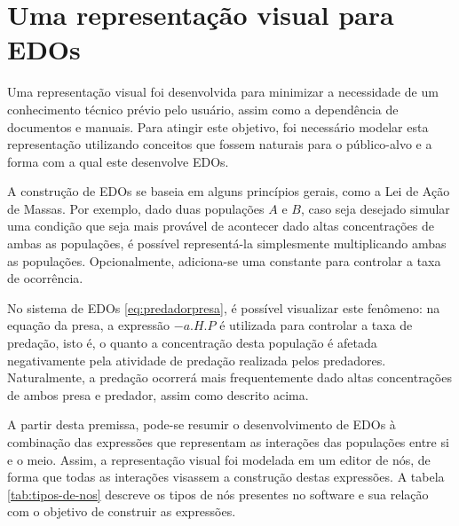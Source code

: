 \documentclass[
	12pt,				%
	openright,			%
	oneside,			%
	a4paper,			%
	main=brazil,
	english,			%
	]{ufsj-abntex2}
\begin{document}
\section{Uma representação visual para EDOs}
\label{sec:representacao-visual-edo}

Uma representação visual foi desenvolvida para minimizar a necessidade de um conhecimento técnico prévio pelo usuário, assim como a dependência de documentos e manuais. Para atingir este objetivo, foi necessário modelar esta representação utilizando conceitos que fossem naturais para o público-alvo e a forma com a qual este desenvolve EDOs.

A construção de EDOs se baseia em alguns princípios gerais, como a Lei de Ação de Massas. Por exemplo, dado duas populações $A$ e $B$, caso seja desejado simular uma condição que seja mais provável de acontecer dado altas concentrações de ambas as populações, é possível representá-la simplesmente multiplicando ambas as populações. Opcionalmente, adiciona-se uma constante para controlar a taxa de ocorrência.

No sistema de EDOs \ref{eq:predadorpresa}, é possível visualizar este fenômeno: na equação da presa, a expressão \(-a.H.P\) é utilizada para controlar a taxa de predação, isto é, o quanto a concentração desta população é afetada negativamente pela atividade de predação realizada pelos predadores. Naturalmente, a predação ocorrerá mais frequentemente dado altas concentrações de ambos presa e predador, assim como descrito acima.

A partir desta premissa, pode-se resumir o desenvolvimento de EDOs à combinação das expressões que representam as interações das populações entre si e o meio. Assim, a representação visual foi modelada em um editor de nós, de forma que todas as interações visassem a construção destas expressões. A tabela \ref{tab:tipos-de-nos} descreve os tipos de nós presentes no software e sua relação com o objetivo de construir as expressões.
\end{document}

